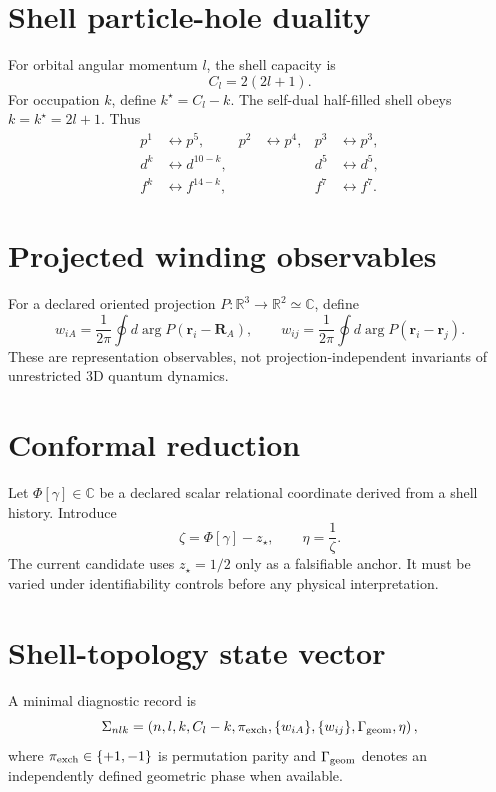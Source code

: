 \section{Shell particle-hole duality}
For orbital angular momentum $l$, the shell capacity is
\begin{equation}
C_l=2(2l+1).
\end{equation}
For occupation $k$, define $k^\star=C_l-k$. The self-dual half-filled shell obeys $k=k^\star=2l+1$. Thus
\begin{align}
p^1&\leftrightarrow p^5,&p^2&\leftrightarrow p^4,&p^3&\leftrightarrow p^3,\\
d^k&\leftrightarrow d^{10-k},&&&d^5&\leftrightarrow d^5,\\
f^k&\leftrightarrow f^{14-k},&&&f^7&\leftrightarrow f^7.
\end{align}

\section{Projected winding observables}
For a declared oriented projection $P:\mathbb R^3\to\mathbb R^2\simeq\mathbb C$, define
\begin{equation}
w_{iA}=\frac{1}{2\pi}\oint d\arg P(\mathbf r_i-\mathbf R_A),\qquad
w_{ij}=\frac{1}{2\pi}\oint d\arg P(\mathbf r_i-\mathbf r_j).
\end{equation}
These are representation observables, not projection-independent invariants of unrestricted 3D quantum dynamics.

\section{Conformal reduction}
Let $\Phi[\gamma]\in\mathbb C$ be a declared scalar relational coordinate derived from a shell history. Introduce
\begin{equation}
\zeta=\Phi[\gamma]-z_\star,\qquad \eta=\frac{1}{\zeta}.
\end{equation}
The current candidate uses $z_\star=1/2$ only as a falsifiable anchor. It must be varied under identifiability controls before any physical interpretation.

\section{Shell-topology state vector}
A minimal diagnostic record is
\begin{equation}
\Sigma_{nlk}=\left(n,l,k,C_l-k,\pi_{\rm exch},\{w_{iA}\},\{w_{ij}\},\Gamma_{\rm geom},\eta\right),
\end{equation}
where $\pi_{\rm exch}\in\{+1,-1\}$ is permutation parity and $\Gamma_{\rm geom}$ denotes an independently defined geometric phase when available.

